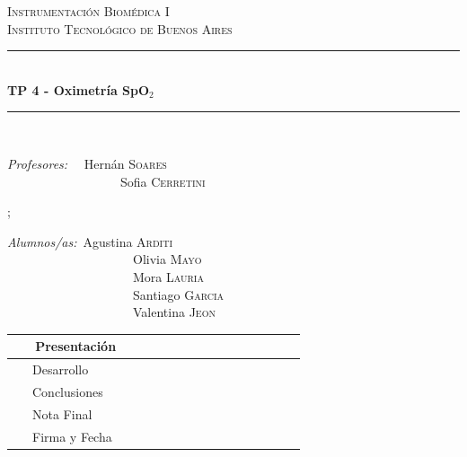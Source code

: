 \documentclass[10pt]{article}
\newcommand{\HRule}{\rule{\linewidth}{0.5mm}}
\begin{document}
\begin{center}


\textsc{\LARGE Instrumentación Biomédica I}\\[0.2cm]
\textsc{\Large Instituto Tecnológico de Buenos Aires}\\[0.2cm]

\HRule\\[0.2cm]
{ \huge \bfseries  TP 4 - Oximetría SpO$_2$ \\[0.2cm] }
\HRule\\[1cm]

\begin{multicols}{2}

{\raggedright{}
\large
\emph{Profesores:} \ \  Hernán   \textsc{Soares}\\

\ \ \ \ \ \ \ \ \ \ \ \ \ \ \ \ \ \  Sofia \textsc{Cerretini} \\
}

\columnbreak;
{\raggedright{}
\large
\emph{Alumnos/as:}\  Agustina  \textsc{Arditi} \\
\ \ \ \ \ \ \ \ \ \ \ \ \ \ \ \ \ \ \ \ Olivia  \textsc{Mayo}\\
\  \ \ \ \ \ \ \ \ \ \ \ \ \ \ \ \ \ \ \ Mora  \textsc{Lauria}\\
\ \ \ \ \ \ \ \ \ \ \ \ \ \ \ \ \ \ \ \ Santiago \textsc{Garcia} \\
\ \ \ \ \ \ \ \ \ \ \ \ \ \ \ \ \ \ \ \ Valentina \textsc{Jeon} \\
}
\end{multicols}

\vspace{0.5cm}

\begin{adjustbox}{max width=\textwidth}

\tabulinesep=1.8mm

  \begin{tabu}{|  l | c |}
    \hline
     \ \ \ Presentación  &       \ \ \  \ \ \  \ \ \   \ \ \ \ \ \  \\ \hline
     \ \ \ Desarrollo &  \\ \hline
     \ \ \ Conclusiones &   \\ \hline
    \ \ \  Nota Final &  \\ \hline \hline
     \ \ \  Firma y Fecha  \ \ \ \ \ \ \ \ \ &   \\
    \hline
  \end{tabu}
\end{adjustbox}

\end{center}
\end{document}
